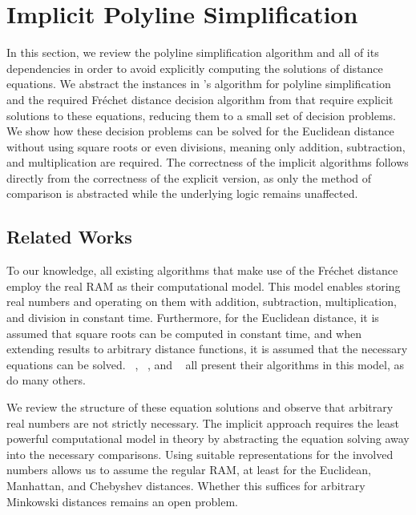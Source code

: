 \section{Implicit Polyline Simplification}\label{sec:implicit_polyline_simplification}
In this section, we review the polyline simplification algorithm and all of its dependencies in order to avoid explicitly computing the solutions of distance equations. We abstract the instances in \citeauthor{on_optimal_polyline_simplification_using_the_hausdorff_and_frechet_distance}'s algorithm for polyline simplification and the required Fréchet distance decision algorithm from \citeauthor{computing_the_frechet_distance_between_two_polygonal_curves} that require explicit solutions to these equations, reducing them to a small set of decision problems.
We show how these decision problems can be solved for the Euclidean distance without using square roots or even divisions, meaning only addition, subtraction, and multiplication are required. The correctness of the implicit algorithms follows directly from the correctness of the explicit version, as only the method of comparison is abstracted while the underlying logic remains unaffected.

\subsection{Related Works}
To our knowledge, all existing algorithms that make use of the Fréchet distance employ the real RAM \cite{computational_geometry_shamos} as their computational model. This model enables storing real numbers and operating on them with addition, subtraction, multiplication, and division in constant time. Furthermore, for the Euclidean distance, it is assumed that square roots can be computed in constant time, and when extending results to arbitrary distance functions, it is assumed that the necessary equations can be solved. ~\cite{computing_the_frechet_distance_between_two_polygonal_curves}, \citeauthor{on_optimal_polyline_simplification_using_the_hausdorff_and_frechet_distance}~\cite{on_optimal_polyline_simplification_using_the_hausdorff_and_frechet_distance}, and \citeauthor{polyline_simplification_has_cubic_complexity_bringmannetal}~\cite{polyline_simplification_has_cubic_complexity_bringmannetal} all present their algorithms in this model, as do many others.

We review the structure of these equation solutions and observe that arbitrary real numbers are not strictly necessary. The implicit approach requires the least powerful computational model in theory by abstracting the equation solving away into the necessary comparisons. Using suitable representations for the involved numbers allows us to assume the regular RAM, at least for the Euclidean, Manhattan, and Chebyshev distances. Whether this suffices for arbitrary Minkowski distances remains an open problem.

